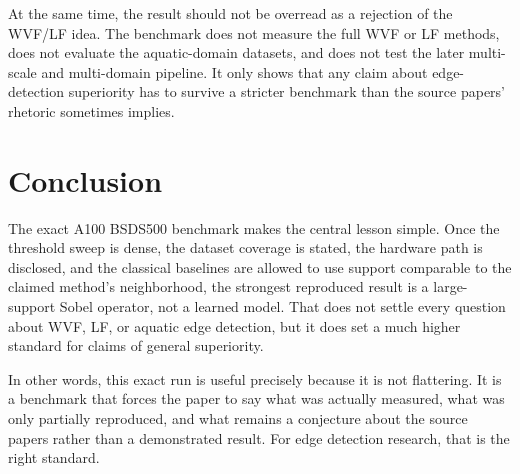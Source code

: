 \documentclass[conference]{IEEEtran}
\begin{document}
At the same time, the result should not be overread as a rejection of the WVF/LF idea. The benchmark does not measure the full WVF or LF methods, does not evaluate the aquatic-domain datasets, and does not test the later multi-scale and multi-domain pipeline. It only shows that any claim about edge-detection superiority has to survive a stricter benchmark than the source papers' rhetoric sometimes implies.

\section{Conclusion}
The exact A100 BSDS500 benchmark makes the central lesson simple. Once the threshold sweep is dense, the dataset coverage is stated, the hardware path is disclosed, and the classical baselines are allowed to use support comparable to the claimed method's neighborhood, the strongest reproduced result is a large-support Sobel operator, not a learned model. That does not settle every question about WVF, LF, or aquatic edge detection, but it does set a much higher standard for claims of general superiority.

In other words, this exact run is useful precisely because it is not flattering. It is a benchmark that forces the paper to say what was actually measured, what was only partially reproduced, and what remains a conjecture about the source papers rather than a demonstrated result. For edge detection research, that is the right standard.
\end{document}
